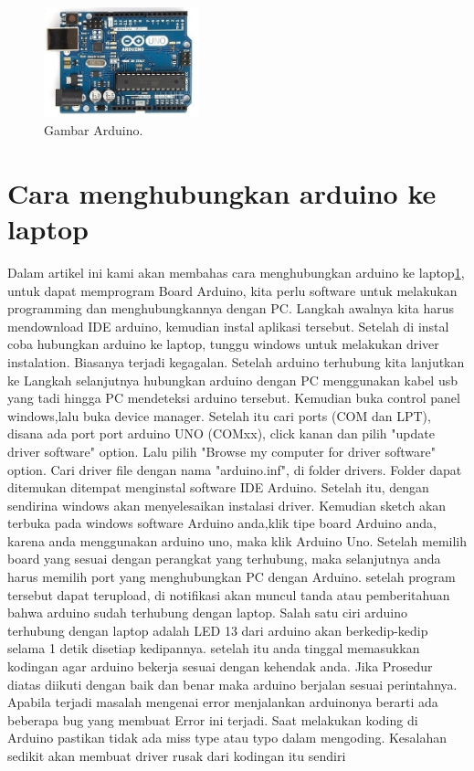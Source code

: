 \begin{figure}[ht]
\centerline{\includegraphics[width=0.4\textwidth]{figures/arduino.jpg}}
\caption{Gambar Arduino.}
\label{gmbr}
\end{figure}

\section{Cara menghubungkan arduino ke laptop}
Dalam artikel ini kami akan membahas cara menghubungkan arduino ke laptop\ref{gmbr}, untuk dapat memprogram Board Arduino, kita perlu software untuk melakukan programming dan menghubungkannya dengan PC. Langkah awalnya kita harus mendownload IDE arduino, kemudian instal aplikasi tersebut. Setelah di instal coba hubungkan arduino ke laptop, tunggu windows untuk melakukan driver instalation. Biasanya terjadi kegagalan.
Setelah arduino terhubung kita lanjutkan ke Langkah selanjutnya hubungkan arduino dengan PC menggunakan kabel usb yang tadi hingga PC mendeteksi arduino tersebut. Kemudian buka control panel windows,lalu buka device manager. Setelah itu cari ports (COM dan LPT), disana ada port port arduino UNO (COMxx), click kanan dan pilih "update driver software" option.
Lalu pilih "Browse my computer for driver software" option. Cari driver file dengan nama "arduino.inf", di folder drivers. Folder dapat ditemukan ditempat menginstal software IDE Arduino.
Setelah itu, dengan sendirina windows akan menyelesaikan instalasi driver. Kemudian sketch akan terbuka pada windows software Arduino anda,klik tipe board Arduino anda, karena anda menggunakan arduino uno, maka klik Arduino Uno.
Setelah memilih board yang sesuai dengan perangkat yang terhubung, maka selanjutnya anda harus memilih port yang menghubungkan PC dengan Arduino.
setelah program tersebut dapat terupload, di notifikasi akan muncul tanda atau pemberitahuan bahwa arduino sudah terhubung dengan laptop. Salah satu ciri arduino terhubung dengan laptop adalah LED 13 dari arduino akan berkedip-kedip selama 1 detik disetiap kedipannya.
setelah itu anda tinggal memasukkan kodingan agar arduino bekerja sesuai dengan kehendak anda.
Jika Prosedur diatas diikuti dengan baik dan benar maka arduino berjalan sesuai perintahnya.
Apabila terjadi masalah mengenai error menjalankan arduinonya berarti ada beberapa bug yang membuat Error ini terjadi.
Saat melakukan koding di Arduino pastikan tidak ada miss type atau typo dalam mengoding. Kesalahan sedikit akan membuat driver rusak dari kodingan itu sendiri

